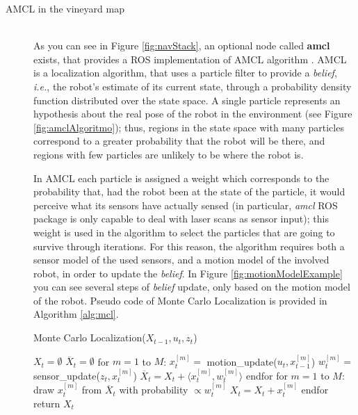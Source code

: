 \begin{description}
\item[AMCL in the vineyard map] \hfill \\
As you can see in Figure \ref{fig:navStack}, an optional node called \textbf{amcl} exists, that provides a \ac{ROS} implementation of \ac{AMCL} algorithm \parencite{amcl}. \ac{AMCL} is a localization algorithm, that uses a particle filter to provide a \textit{belief}, \textit{i.e.}, the robot's estimate of its current state, through a probability density function distributed over the state space. A single particle represents an hypothesis about the real pose of the robot in the environment (see Figure \ref{fig:amclAlgoritmo}); thus, regions in the state space with many particles correspond to a greater probability that the robot will be there, and regions with few particles are unlikely to be where the robot is.

\par In \ac{AMCL} each particle is assigned a weight which corresponds to the probability that, had the robot been at the state of the particle, it would perceive what its sensors have actually sensed (in particular, \textit{amcl} \ac{ROS} package is only capable to deal with laser scans as sensor input); this weight is used in the algorithm to select the particles that are going to survive through iterations. For this reason, the algorithm requires both a sensor model of the used sensors, and a motion model of the involved robot, in order to update the \textit{belief}. In Figure \ref{fig:motionModelExample} you can see several steps of \textit{belief} update, only based on the motion model of the robot. Pseudo code of Monte Carlo Localization is provided in Algorithm \ref{alg:mcl}.

\begin{algorithm}
\caption{Monte Carlo Localization($X_{t-1},u_t,z_t$)}\label{alg:mcl}
\begin{algorithmic}[1]
\State $X_t=\emptyset$ 				
\State $\overline{X}_t=\emptyset$
\State for $m=1$ to $M$: 				
\Indent
	\State $x^{[m]}_t=$ motion\_update($u_t,x^{[m]}_{t-1}$)	 
	\State $w^{[m]}_t=$ sensor\_update($z_t,x^{[m]}_{t}$)	
	\State $\overline{X}_t = {X}_t + \big \langle x^{[m]}_t, w^{[m]}_t \big \rangle$
\EndIndent
\State endfor
\State for $m=1$ to $M$: 
\Indent
	\State draw $x^{[m]}_t$ from $\overline{X}_t$ with probability $\propto w^{[m]}_t$
	\State $X_t=X_t+x^{[m]}_t$
\EndIndent
\State endfor
\State return $X_t$
\end{algorithmic}
\end{algorithm}


\end{description}
